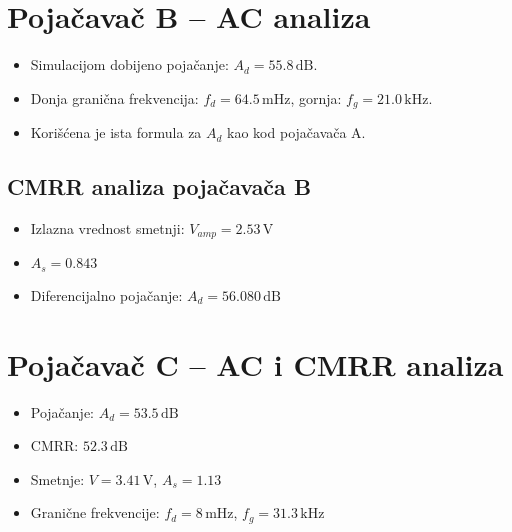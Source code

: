 \documentclass[a4paper]{article}
\begin{document}
\newpage
\section*{Poja\v{c}ava\v{c} B -- AC analiza}
\begin{itemize}
  \item Simulacijom dobijeno poja\v{c}anje: $A_d = 55.8\,\text{dB}$.
  \item Donja grani\v{c}na frekvencija: $f_d = 64.5\,\text{mHz}$, gornja: $f_g = 21.0\,\text{kHz}$.
  \item Kori\v{s}\'cena je ista formula za $A_d$ kao kod poja\v{c}ava\v{c}a A.
\end{itemize}

\subsection*{CMRR analiza poja\v{c}ava\v{c}a B}
\begin{itemize}
  \item Izlazna vrednost smetnji: $V_{amp} = 2.53\,\text{V}$
  \item $A_s = 0.843$
  \item Diferencijalno poja\v{c}anje: $A_d = 56.080\,\text{dB}$
\end{itemize}

\newpage
\section*{Poja\v{c}ava\v{c} C -- AC i CMRR analiza}
\begin{itemize}
  \item Poja\v{c}anje: $A_d = 53.5\,\text{dB}$
  \item CMRR: $52.3\,\text{dB}$
  \item Smetnje: $V = 3.41\,\text{V}$, $A_s = 1.13$
  \item Grani\v{c}ne frekvencije: $f_d = 8\,\text{mHz}$, $f_g = 31.3\,\text{kHz}$
\end{itemize}
\end{document}
